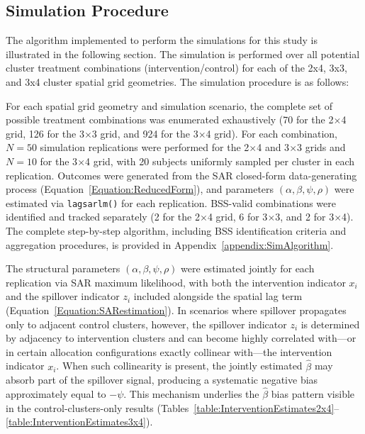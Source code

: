 \documentclass{article}[11pt]
\begin{document}
\subsection{Simulation Procedure}\label{section:SimProcedure}

The algorithm implemented to perform the simulations for this study is illustrated in the following section. The simulation is performed over all potential cluster treatment combinations (intervention/control) for each of the 2x4, 3x3, and 3x4 cluster spatial grid geometries. The simulation procedure is as follows:

For each spatial grid geometry and simulation scenario, the complete set of possible treatment combinations was enumerated exhaustively (70 for the 2$\times$4 grid, 126 for the 3$\times$3 grid, and 924 for the 3$\times$4 grid). For each combination, $N = 50$ simulation replications were performed for the 2$\times$4 and 3$\times$3 grids and $N = 10$ for the 3$\times$4 grid, with 20 subjects uniformly sampled per cluster in each replication. Outcomes were generated from the SAR closed-form data-generating process (Equation~\ref{Equation:ReducedForm}), and parameters $(\alpha, \beta, \psi, \rho)$ were estimated via \texttt{lagsarlm()} for each replication. BSS-valid combinations were identified and tracked separately (2 for the 2$\times$4 grid, 6 for 3$\times$3, and 2 for 3$\times$4). The complete step-by-step algorithm, including BSS identification criteria and aggregation procedures, is provided in Appendix~\ref{appendix:SimAlgorithm}.

The structural parameters $(\alpha, \beta, \psi, \rho)$ were estimated jointly for each replication via SAR maximum likelihood, with both the intervention indicator $x_i$ and the spillover indicator $z_i$ included alongside the spatial lag term (Equation~\ref{Equation:SARestimation}). In scenarios where spillover propagates only to adjacent control clusters, however, the spillover indicator $z_i$ is determined by adjacency to intervention clusters and can become highly correlated with---or in certain allocation configurations exactly collinear with---the intervention indicator $x_i$. When such collinearity is present, the jointly estimated $\hat{\beta}$ may absorb part of the spillover signal, producing a systematic negative bias approximately equal to $-\psi$. This mechanism underlies the $\hat{\beta}$ bias pattern visible in the control-clusters-only results (Tables~\ref{table:InterventionEstimates2x4}--\ref{table:InterventionEstimates3x4}).
\end{document}
